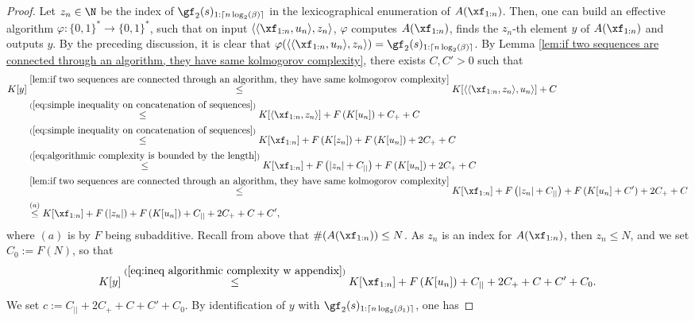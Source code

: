 \begin{proof}
Let $z_n \in \N$ be the index of $\gf_2(s)_{1: \lceil n \log_2(\beta) \rceil}$ in the lexicographical enumeration of $A(\xf_{1: n})$. Then, one can build an effective algorithm $\varphi : \{0,1\}^\ast \to \{0,1\}^\ast$, such that on input $\langle \langle\xf_{1: n}, u_n \rangle,  z_n \rangle$, $\varphi$ computes $A(\xf_{1: n})$, finds the $z_n$-th element $y$ of $A(\xf_{1: n})$ and outputs $y$.
 By the preceding discussion, it is clear that $\varphi(\langle \langle \xf_{1: n},  u_n\rangle,  z_n  \rangle) = \gf_2(s)_{1: \lceil n \log_2(\beta) \rceil}$. By Lemma \ref{lem:if two sequences are connected through an algorithm, they have same kolmogorov complexity}, there exists $C,C' > 0$ such that 
 \begin{align}\label{eq:first bounding of kolmogorov complexity of greedy binary expansion}
	K[y] &\overset{\ref{lem:if two sequences are connected through an algorithm, they have same kolmogorov complexity}}{\leq} K[\langle \langle\xf_{1: n}, z_n \rangle,  u_n \rangle ] + C\\
	&\overset{(\ref{eq:simple inequality on concatenation of sequences})}{\leq} K[\langle \xf_{1: n}, z_n \rangle] + F\left(K[u_n]\right) + C_+ + C\\
	&\overset{(\ref{eq:simple inequality on concatenation of sequences})}{\leq} K[\xf_{1: n}] + F\left(K[z_n]\right) + F\left(K[u_n]\right) + 2C_+ + C\\
	&\overset{(\ref{eq:algorithmic complexity is bounded by the length})}{\leq} K[\xf_{1: n}] + F\left(|z_n|+ C_{||}\right) + F\left(K[u_n]\right) + 2C_+ + C\\
	&\overset{\ref{lem:if two sequences are connected through an algorithm, they have same kolmogorov complexity}}{\leq} K[\xf_{1: n}] + F\left(|z_n|+ C_{||}\right) + F\left(K[u_n] + C'\right)  + 2C_+ + C\\
	&\overset{(a)}{\leq} K[\xf_{1: n}] + F\left(|z_n|\right) + F\left(K[u_n]\right) + C_{||} + 2C_+ + C + C',\label{eq:ineq algorithmic complexity w appendix}
 \end{align}
 where $(a)$ is by $F$ being subadditive.
 Recall from above that $\#(A(\xf_{1:n})) \leq N$. As $z_n$ is an index for $A(\xf_{1:n})$, then $z_n \leq N$, and we set $C_0 :=  F(N)$, so that 
 \begin{equation}
 K[y] \overset{(\ref{eq:ineq algorithmic complexity w appendix})}{\leq} K[\xf_{1: n}] + F\left(K[u_n]\right) + C_{||} + 2C_+ + C + C' + C_0.
 \end{equation}
We set $c := C_{||} + 2C_+ + C + C' + C_0$. By identification of $y$ with $\gf_2(s)_{1: \lceil n \log_2(\beta_1) \rceil}$, one has 

\end{proof}

